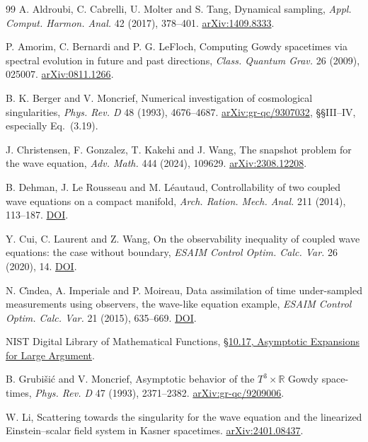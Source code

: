 \documentclass[11pt]{article}
\begin{document}
\clearpage
\begin{thebibliography}{99}
\setlength{\itemsep}{1pt}
 A. Aldroubi, C. Cabrelli, U. Molter and S. Tang,
Dynamical sampling, \emph{Appl. Comput. Harmon. Anal.} 42 (2017),
378--401. \href{https://arxiv.org/abs/1409.8333}{arXiv:1409.8333}.

 P. Amorim, C. Bernardi and P. G. LeFloch,
Computing Gowdy spacetimes via spectral evolution in future and past
directions, \emph{Class. Quantum Grav.} 26 (2009), 025007.
\href{https://arxiv.org/abs/0811.1266}{arXiv:0811.1266}.

 B. K. Berger and V. Moncrief,
Numerical investigation of cosmological singularities,
\emph{Phys. Rev. D} 48 (1993), 4676--4687.
\href{https://arxiv.org/abs/gr-qc/9307032}{arXiv:gr-qc/9307032},
\S\S III--IV, especially Eq.~(3.19).

 J. Christensen, F. Gonzalez, T. Kakehi and J. Wang,
The snapshot problem for the wave equation,
\emph{Adv. Math.} 444 (2024), 109629.
\href{https://arxiv.org/abs/2308.12208}{arXiv:2308.12208}.

 B. Dehman, J. Le Rousseau and M. Léautaud,
Controllability of two coupled wave equations on a compact manifold,
\emph{Arch. Ration. Mech. Anal.} 211 (2014), 113--187.
\href{https://doi.org/10.1007/s00205-013-0670-4}{DOI}.

 Y. Cui, C. Laurent and Z. Wang,
On the observability inequality of coupled wave equations:
the case without boundary,
\emph{ESAIM Control Optim. Calc. Var.} 26 (2020), 14.
\href{https://doi.org/10.1051/cocv/2020004}{DOI}.

 N. C\^{\i}ndea, A. Imperiale and P. Moireau,
Data assimilation of time under-sampled measurements using
observers, the wave-like equation example,
\emph{ESAIM Control Optim. Calc. Var.} 21 (2015), 635--669.
\href{https://doi.org/10.1051/cocv/2014042}{DOI}.

 NIST Digital Library of Mathematical Functions,
\href{https://dlmf.nist.gov/10.17}{\S 10.17, Asymptotic Expansions for Large Argument}.

 B. Grubi\v{s}i\'{c} and V. Moncrief,
Asymptotic behavior of the $T^3\times\mathbb R$ Gowdy space-times,
\emph{Phys. Rev. D} 47 (1993), 2371--2382.
\href{https://arxiv.org/abs/gr-qc/9209006}{arXiv:gr-qc/9209006}.

 W. Li,
Scattering towards the singularity for the wave equation and
the linearized Einstein--scalar field system in Kasner spacetimes.
\href{https://arxiv.org/abs/2401.08437}{arXiv:2401.08437}.


\end{thebibliography}
\end{document}
